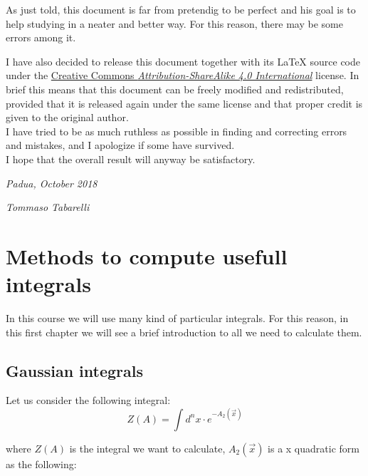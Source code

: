 \documentclass[12pt, english, a4paper]{book}
\begin{document}
As just told, this document is far from pretendig to be perfect and his goal is to help studying in a neater and better way. For this reason, there may be some errors among it.

I have also decided to release this document together with its \LaTeX{} source code under the \href{http://creativecommons.org/licenses/by-sa/4.0/}{\color{blue}Creative Commons \emph{Attribution-ShareAlike 4.0 International}} license. In brief this means that this document can be freely modified and redistributed, provided that it is released again under the same license and that proper credit is given to the original author.\\

I have tried to be as much ruthless as possible in finding and correcting errors and mistakes, and I apologize if some have survived.\\

I hope that the overall result will anyway be satisfactory.

\vspace{2em}

\hfill \emph{Padua, October 2018}

\hfill \emph{Tommaso Tabarelli}

\newpage
\thispagestyle{empty}
\let\cleardoublepage\clearpage

\tableofcontents
{}

\chapter{Methods to compute usefull integrals}

In this course we will use many kind of particular integrals. For this reason, in this first chapter we will see a brief introduction to all we need to calculate them.

\section{Gaussian integrals}

Let us consider the following integral:\\

\begin{equation}\label{Gaussian Integral}
Z(A) = \int d^{n}x \cdot e^{ -A_2(\vec{x}) }
\end{equation}

where $Z(A)$ is the integral we want to calculate, $A_2(\vec{x})$ is a x quadratic form as the following:
\end{document}
